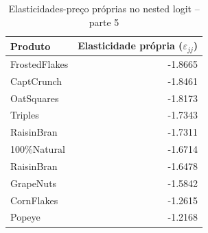 \begin{table}[H]
\centering
\caption{Elasticidades-preço próprias no nested logit -- parte 5}
\label{tab:own-elasticities-nested-logit-parte-5}
\begin{tabular}{lr}
\toprule
Produto & Elasticidade própria ($\varepsilon_{jj}$) \\
\midrule
FrostedFlakes & -1.8665 \\
CaptCrunch & -1.8461 \\
OatSquares & -1.8173 \\
Triples & -1.7343 \\
RaisinBran & -1.7311 \\
100\%Natural & -1.6714 \\
RaisinBran & -1.6478 \\
GrapeNuts & -1.5842 \\
CornFlakes & -1.2615 \\
Popeye & -1.2168 \\
\bottomrule
\end{tabular}
\end{table}

\endgroup